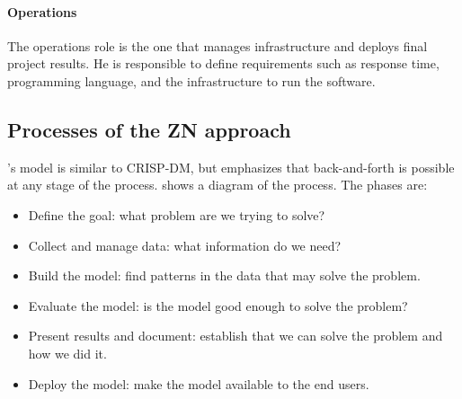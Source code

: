 \paragraph{Operations}  The operations role is the one that manages infrastructure and
deploys final project results.  He is responsible to define requirements such as response
time, programming language, and the infrastructure to run the software.

\subsection{Processes of the ZN approach}

\citeauthor{Zumel2019}'s model is similar to CRISP-DM, but emphasizes that back-and-forth
is possible at any stage of the process.   shows a diagram of the process.
The phases are:
\begin{itemize}
  \item Define the goal: what problem are we trying to solve?
  \item Collect and manage data: what information do we need?
  \item Build the model: find patterns in the data that may solve the problem.
  \item Evaluate the model: is the model good enough to solve the problem?
  \item Present results and document: establish that we can solve the problem and how we
    did it.
  \item Deploy the model: make the model available to the end users.
\end{itemize}

